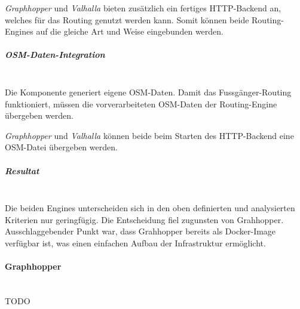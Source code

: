 \emph{Graphhopper} und \emph{Valhalla} bieten zusätzlich ein fertiges HTTP-Backend an, welches für das Routing genutzt werden kann. Somit können beide Routing-Engines auf die gleiche Art und Weise eingebunden werden.


\subparagraph{OSM-Daten-Integration}~\\
\label{architektur:OSM-Daten-Integration}
Die Komponente  generiert eigene \ac{OSM}-Daten. Damit das Fussgänger-Routing funktioniert, müssen die vorverarbeiteten \ac{OSM}-Daten der Routing-Engine übergeben werden. 

\emph{Graphhopper} und \emph{Valhalla} können beide beim Starten des HTTP-Backend eine \ac{OSM}-Datei übergeben werden.


\subparagraph{Resultat}~\\
\label{architektur:Resulat}
Die beiden Engines unterscheiden sich in den oben definierten und analysierten Kriterien nur geringfügig. Die Entscheidung fiel zugunsten von Grahhopper. Ausschlaggebender Punkt war, dass Grahhopper bereits als Docker-Image verfügbar ist, was einen einfachen Aufbau der Infrastruktur ermöglicht.

\paragraph{Graphhopper}~\\
\label{architektur:Graphhopper}
TODO 



